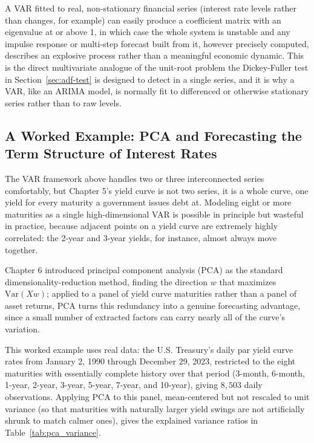 \documentclass[../ai_in_finance]{subfiles}
\begin{document}
A VAR fitted to real, non-stationary financial series (interest rate levels rather than changes, for example) can easily produce a coefficient matrix with an eigenvalue at or above 1, in which case the whole system is unstable and any impulse response or multi-step forecast built from it, however precisely computed, describes an explosive process rather than a meaningful economic dynamic. This is the direct multivariate analogue of the unit-root problem the Dickey-Fuller test in Section~\ref{sec:adf-test} is designed to detect in a single series, and it is why a VAR, like an ARIMA model, is normally fit to differenced or otherwise stationary series rather than to raw levels.

\subsection{A Worked Example: PCA and Forecasting the Term Structure of Interest Rates}
\label{sec:pca-term-structure}

The VAR framework above handles two or three interconnected series comfortably, but Chapter 5's yield curve is not two series, it is a whole curve, one yield for every maturity a government issues debt at. Modeling eight or more maturities as a single high-dimensional VAR is possible in principle but wasteful in practice, because adjacent points on a yield curve are extremely highly correlated: the 2-year and 3-year yields, for instance, almost always move together.

Chapter 6 introduced principal component analysis (PCA) as the standard dimensionality-reduction method, finding the direction $w$ that maximizes $\text{Var}(Xw)$; applied to a panel of yield curve maturities rather than a panel of asset returns, PCA turns this redundancy into a genuine forecasting advantage, since a small number of extracted factors can carry nearly all of the curve's variation.

This worked example uses real data: the U.S. Treasury's daily par yield curve rates from January 2, 1990 through December 29, 2023, restricted to the eight maturities with essentially complete history over that period (3-month, 6-month, 1-year, 2-year, 3-year, 5-year, 7-year, and 10-year), giving $8{,}503$ daily observations. Applying PCA to this panel, mean-centered but not rescaled to unit variance (so that maturities with naturally larger yield swings are not artificially shrunk to match calmer ones), gives the explained variance ratios in Table~\ref{tab:pca_variance}.
\end{document}
